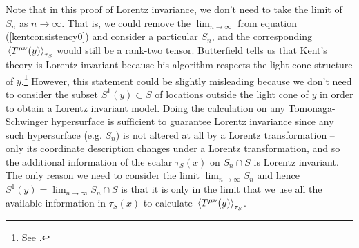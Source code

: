 Note that in this proof of Lorentz invariance, we don't need to take the limit of $S_n$ as $n\rightarrow\infty$. That is, we could remove the $\lim_{n\rightarrow\infty}$ from equation (\ref{kentconsistency0}) and consider a particular $S_n$, and the corresponding $\ev*{T^{\mu\nu}(y)}_{\tau_S}$ would still be a rank-two tensor. Butterfield tells us that Kent's theory is  Lorentz invariant because his algorithm respects the light cone structure of $y$.\footnote{See \cite[30]{Butterfield}.} However, this statement could be slightly misleading because we don't need to consider the subset $S^1(y)\subset S$ of locations outside the light cone of $y$ in order to obtain a Lorentz invariant model. Doing the calculation on any Tomonaga-Schwinger hypersurface is sufficient to guarantee Lorentz invariance since any such hypersurface (e.g. $S_n$) is not altered at all by a Lorentz transformation -- only its coordinate description changes under a Lorentz transformation, and so the additional information of the scalar $\tau_S(x)$ on $S_n\cap S$ is Lorentz invariant. The only reason we need to consider the limit $\lim_{n\rightarrow \infty}S_n$ and hence $S^1(y)=\lim_{n\rightarrow \infty}S_n\cap S$ is that it is only in the limit that we use all the available information in $\tau_S(x)$ to calculate $\ev*{T^{\mu\nu}(y)}_{\tau_S}$. 


